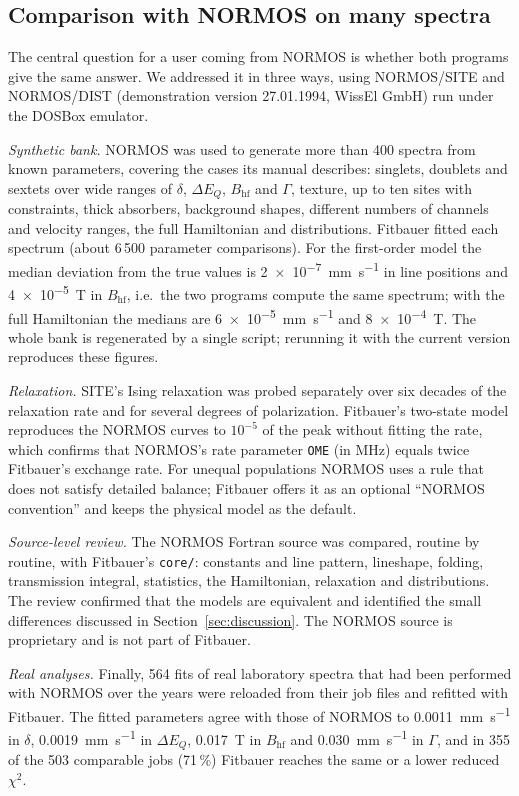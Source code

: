 \documentclass[smallcondensed]{svjour3}
\begin{document}
\subsection{Comparison with NORMOS on many spectra}
\label{sec:normos-bench}

The central question for a user coming from NORMOS is whether both
programs give the same answer. We addressed it in three ways, using
NORMOS/SITE and NORMOS/DIST (demonstration version 27.01.1994, WissEl
GmbH) run under the DOSBox emulator.

\emph{Synthetic bank.} NORMOS was used to generate more than 400 spectra from known
parameters, covering the cases its manual describes: singlets, doublets
and sextets over wide ranges of $\delta$, $\Delta E_Q$, $B_\mathrm{hf}$
and $\Gamma$, texture, up to ten sites with constraints, thick absorbers,
background shapes, different numbers of channels and velocity ranges,
the full Hamiltonian and distributions. Fitbauer fitted each spectrum
(about 6\,500 parameter comparisons). For the first-order
model the median deviation from the true values is
\SI{2e-7}{\milli\metre\per\second} in line positions and
\SI{4e-5}{\tesla} in $B_\mathrm{hf}$, i.e.\ the two programs compute the
same spectrum; with the full Hamiltonian the medians are
\SI{6e-5}{\milli\metre\per\second} and \SI{8e-4}{\tesla}.
The whole bank is regenerated by a single script; rerunning it with the
current version reproduces these figures.

\emph{Relaxation.} SITE's Ising relaxation was probed separately over six
decades of the relaxation rate and for several degrees of polarization.
Fitbauer's two-state model reproduces the NORMOS curves to $10^{-5}$ of the
peak without fitting the rate, which confirms that NORMOS's rate parameter
\texttt{OME} (in MHz) equals twice Fitbauer's exchange rate. For unequal
populations NORMOS uses a rule that does not satisfy detailed balance;
Fitbauer offers it as an optional ``NORMOS convention'' and keeps the
physical model as the default.

\emph{Source-level review.} The NORMOS Fortran source was compared,
routine by routine, with Fitbauer's \texttt{core/}: constants and line
pattern, lineshape, folding, transmission integral, statistics, the
Hamiltonian, relaxation and distributions. The review confirmed that the
models are equivalent and identified the small differences discussed in
Section~\ref{sec:discussion}. The NORMOS source is proprietary and is not
part of Fitbauer.

\emph{Real analyses.} Finally, 564 fits of real laboratory spectra that
had been performed with NORMOS over the years were reloaded from their job
files and refitted with Fitbauer. The fitted parameters agree with those
of NORMOS to \SI{0.0011}{\milli\metre\per\second} in $\delta$,
\SI{0.0019}{\milli\metre\per\second} in $\Delta E_Q$,
\SI{0.017}{\tesla} in $B_\mathrm{hf}$ and
\SI{0.030}{\milli\metre\per\second} in $\Gamma$, and in 355 of the 503
comparable jobs (71\,\%) Fitbauer reaches the same or a lower reduced
$\chi^2$.
\end{document}
